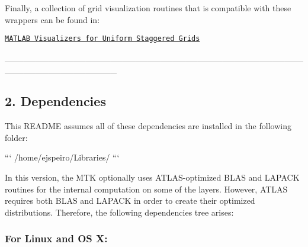 \begin{DoxyPre}Finally, a collection of grid visualization routines that is compatible with
these wrappers can be found in:\end{DoxyPre}



\begin{DoxyPre}\href{https://github.com/ejspeiro/UniStgGrid-Visualizers}{\tt MATLAB Visualizers for Uniform Staggered Grids}
\begin{DoxyVerb}__________________________________________________________________
\end{DoxyVerb}
\end{DoxyPre}



\begin{DoxyPre}\subsection*{2. Dependencies}\end{DoxyPre}



\begin{DoxyPre}\end{DoxyPre}



\begin{DoxyPre}This README assumes all of these dependencies are installed in the following
folder:\end{DoxyPre}



\begin{DoxyPre}```
/home/ejspeiro/Libraries/
```\end{DoxyPre}



\begin{DoxyPre}In this version, the MTK optionally uses ATLAS-optimized BLAS and LAPACK
routines for the internal computation on some of the layers. However, ATLAS
requires both BLAS and LAPACK in order to create their optimized distributions.
Therefore, the following dependencies tree arises:\end{DoxyPre}



\begin{DoxyPre}\subsubsection*{For Linux and OS X:}\end{DoxyPre}



